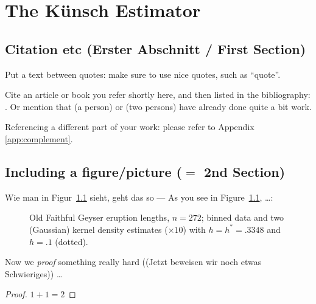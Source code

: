 \chapter{The Künsch Estimator}%

\section{Citation etc (Erster Abschnitt / First Section)}
Put a text between quotes: make sure to use nice quotes, such as ``quote''.

Cite an article or book you refer shortly here, and then listed in the bibliography: \cite{ReferenceKey}. 
Or mention that \citeauthor{HamF85} (a person) or \citeauthor{StaWW91} (two
persons) have already done quite a bit work.

Referencing a different part of your work: please refer to Appendix \ref{app:complement}.

\section{Including a figure/picture ($=$ 2nd Section)}

Wie man in Figur~\ref{fig:geys1} sieht, geht das so ---
As you see in Figure~\ref{fig:geys1}, \dots :

\begin{figure}[hbt!]%
  \caption[Geyser data: binned histogram, Silverman's and another
  kernel]%
  {Old Faithful Geyser eruption lengths, $n=272$; binned
    data and 
    two (Gaussian) kernel density estimates ($\times 10$) with $h=h^*= .3348$
    and $h= .1$ (dotted).}%
  \label{fig:geys1}
\end{figure}
Now we \emph{proof} something really hard
((Jetzt beweisen wir noch etwas Schwieriges)) \dots

\begin{proof}
  $1 + 1 = 2$
\end{proof}



